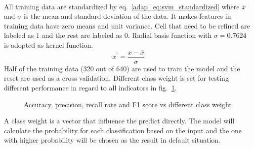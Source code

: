 \paragraph{}
All training data are standardized by eq.~\ref{adap_eq:svm_standardized} where $\overline{x}$ and $\sigma$ is the mean and standard deviation of the data.
It makes features in training data have zero means and unit variance.
Cell that need to be refined are labeled as $1$ and the rest are labeled as $0$.
Radial basis function with $\sigma=0.7624$ is adopted as kernel function.
    \begin{equation}
        x^\prime = \frac{x-\overline{x}}{\sigma}
        \label{adap_eq:svm_standardized}
    \end{equation}
Half of the training data (320 out of 640) are used to train the model and the reset are used as a cross validation.
Different class weight is set for testing different performance in regard to all indicators in fig.~\ref{adap_fig:svm_performance_0}.
\begin{figure}[h!]
    \centering
    \caption{Accuracy, precision, recall rate and F1 score vs different class weight}
    \label{adap_fig:svm_performance_0}
\end{figure}
A class weight is a vector that influence the predict directly.
The model will calculate the probability for each classification based on the input and the one with higher probability will be chosen as the result in default situation.
